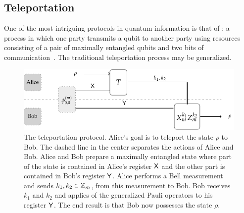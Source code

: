 \subsection{Teleportation} \label{sec:teleportation}

One of the most intriguing protocols in quantum information is that of : a process in which one party transmits a qubit to another party using resources consisting of a pair of maximally entangled qubits and two bits of communication~\cite{Bennett1993}. The traditional teleportation process may be generalized.

\begin{figure}[!htpb] 
	\begin{center}
		\includegraphics[scale=1.0]{figures/teleportation.pdf}
	\end{center}
		\caption[The teleportation protocol.]{The teleportation protocol. Alice's goal is to teleport the state $\rho$ to Bob. The dashed line in the center separates the actions of Alice and Bob. Alice and Bob prepare a maximally entangled state where part of the state is contained in Alice's register $\mathsf{X}$ and the other part is contained in Bob's register $\mathsf{Y}$. Alice performs a Bell measurement and sends $k_1,k_2 \in \mathbb{Z}_m$, from this measurement to Bob. Bob receives $k_1$ and $k_2$ and applies of the generalized Pauli operators to his register $\mathsf{Y}$. The end result is that Bob now possesses the state $\rho$. }
	\label{fig:teleportation}
\end{figure}

